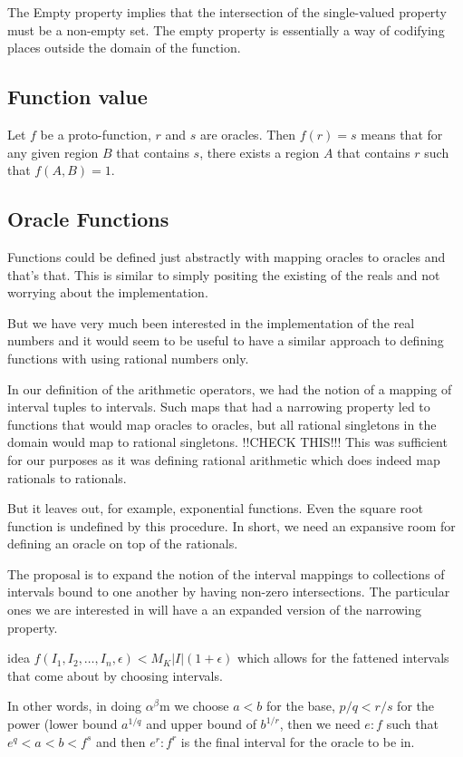 \documentclass[12pt]{article}
\theoremstyle{remark}
\begin{document}
The Empty property implies that the intersection of the single-valued property must be a non-empty set. The empty property is essentially a way of codifying places outside the domain of the function. 

\subsection{Function value}

Let $f$ be a proto-function, $r$ and $s$ are oracles. Then $f(r) = s$ means that for any given region $B$ that contains $s$, there exists a region $A$ that contains $r$ such that $f(A,B) = 1$.

\subsection{Oracle Functions}

Functions could be defined just abstractly with mapping oracles to oracles and that's that. This is similar to simply positing the existing of the reals and not worrying about the implementation. 

But we have very much been interested in the implementation of the real numbers and it would seem to be useful to have a similar approach to defining functions with using rational numbers only. 

In our definition of the arithmetic operators, we had the notion of a mapping of interval tuples to intervals. Such maps that had a narrowing property led to functions that would map oracles to oracles, but all rational singletons in the domain would map to rational singletons. !!CHECK THIS!!! This was sufficient for our purposes as it was defining rational arithmetic which does indeed map rationals to rationals. 

But it leaves out, for example, exponential functions. Even the square root function is undefined by this procedure. In short, we need an expansive room for defining an oracle on top of the rationals. 

The proposal is to expand the notion of the interval mappings to collections of intervals bound to one another by having non-zero intersections. The particular ones we are interested in will have a an expanded version of the narrowing property. 

idea $f(I_1, I_2, \ldots, I_n, \epsilon) < M_K |I|(1+\epsilon)$ which allows for the fattened intervals that come about by choosing intervals. 

In other words,  in doing $\alpha^\beta$m we choose $a<b$ for the base, $p/q<r/s$ for the power (lower bound $a^{1/q}$ and upper bound of $b^{1/r}$, then we need $e:f$ such that $e^q < a < b < f^s$ and then $e^r:f^r$ is the final interval for the oracle to be in. 
\end{document}
